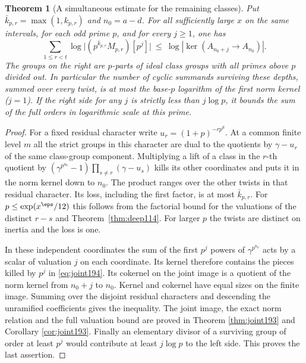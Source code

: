 \documentclass[a4paper,11pt]{article}
\newtheorem{theorem}[proposition]{Theorem}
\theoremstyle{definition}
\theoremstyle{remark}
\numberwithin{equation}{section}
\begin{document}
\begin{theorem}[A simultaneous estimate for the remaining classes]
\label{thm:joint194}
Put \(\bar k_{p,r}=\max(1,k_{p,r})\) and \(n_0=a-d\).
For all sufficiently large \(x\) on the same intervals,
for each odd prime \(p\), and for every \(j\ge1\), one has
\begin{equation}
  \sum_{1\le r<t}\log\big|(p^{\bar k_{p,r}}M_{p,r})[p^j]\big|
     \ \le\ \log|\ker(A_{n_0+j}\longrightarrow A_{n_0})| .
     \label{eq:joint194}
\end{equation}
The groups on the right are \(p\)-parts of ideal class groups
with all primes above \(p\) divided out. In particular the
number of cyclic summands surviving these depths, summed over
every twist, is at most the base-\(p\) logarithm of the first
norm kernel (\(j=1\)). If the right side for any \(j\) is
strictly less than \(j\log p\), it bounds the sum of the
full orders in logarithmic scale at this prime.
\end{theorem}
\begin{proof}
For a fixed residual character write \(u_r=(1+p)^{-rp^d}\).
At a common finite level \(m\) all the strict groups in this
character are dual to the quotients by \(\gamma-u_r\) of the
same class-group component. Multiplying a lift of a class in
the \(r\)-th quotient by
\((\gamma^{p^{n_0}}-1)\prod_{s\ne r}(\gamma-u_s)\) kills its
other coordinates and puts it in the norm kernel down to
\(n_0\). The product ranges over the other twists in that
residual character. Its loss, including the first factor,
is at most \(\bar k_{p,r}\). For \(p\le\exp(x^\eps/12)\) this
follows from the factorial bound for the valuations of the
distinct \(r-s\) and Theorem~\ref{thm:deep114}. For larger
\(p\) the twists are distinct on inertia and the loss is one.

In these independent coordinates the sum of the first \(p^j\)
powers of \(\gamma^{p^{n_0}}\) acts by a scalar of valuation
\(j\) on each coordinate. Its kernel therefore contains the
pieces killed by \(p^j\) in \eqref{eq:joint194}. Its cokernel
on the joint image is a quotient of the norm kernel from
\(n_0+j\) to \(n_0\). Kernel and cokernel have equal sizes on
the finite image. Summing over the disjoint residual characters
and descending the unramified coefficients gives the inequality.
The joint image, the exact norm relation and the full valuation
bound are proved in Theorem \ref{thm:joint193} and Corollary \ref{cor:joint193}. Finally an elementary divisor
of a surviving group of order at least \(p^j\) would contribute
at least \(j\log p\) to the left side. This proves the last assertion.
\end{proof}
\end{document}
